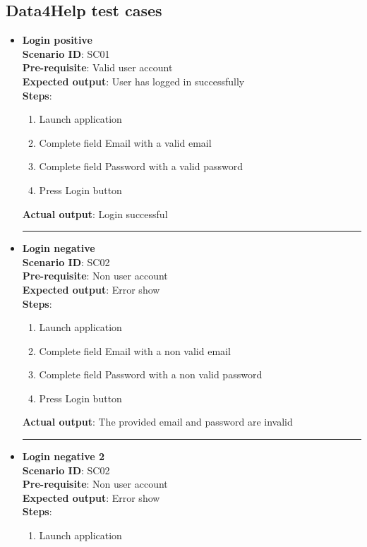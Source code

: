 \documentclass[a4paper, hidelinks, 12pt]{report}
\begin{document}
\subsection{Data4Help test cases}
\begin{itemize}
		\item{\textbf{Login positive}} \\
		\textbf{Scenario ID}: SC01 \\
		\textbf{Pre-requisite}: Valid user account \\
		\textbf{Expected output}: User has logged in successfully\\
		\textbf{Steps}:
		\begin{enumerate}
			\item{Launch application}
			\item{Complete field Email with a valid email}
			\item{Complete field Password with a valid password}
			\item{Press Login button}
		\end{enumerate}
		\textbf{Actual output}: Login successful \\
		\rule{\linewidth}{0.4pt}
		\item{\textbf{Login negative}} \\
		\textbf{Scenario ID}: SC02 \\
		\textbf{Pre-requisite}: Non user account \\
		\textbf{Expected output}: Error show\\
		\textbf{Steps}:
		\begin{enumerate}
			\item{Launch application}
			\item{Complete field Email with a non valid email}
			\item{Complete field Password with a non valid password}
			\item{Press Login button}
		\end{enumerate}
		\textbf{Actual output}: The provided email and password are invalid \\
		\rule{\linewidth}{0.4pt}
		\item{\textbf{Login negative 2}} \\
		\textbf{Scenario ID}: SC02 \\
		\textbf{Pre-requisite}: Non user account \\
		\textbf{Expected output}: Error show\\
		\textbf{Steps}:
		\begin{enumerate}
			\item{Launch application}

\end{enumerate}
\end{itemize}
\end{document}
